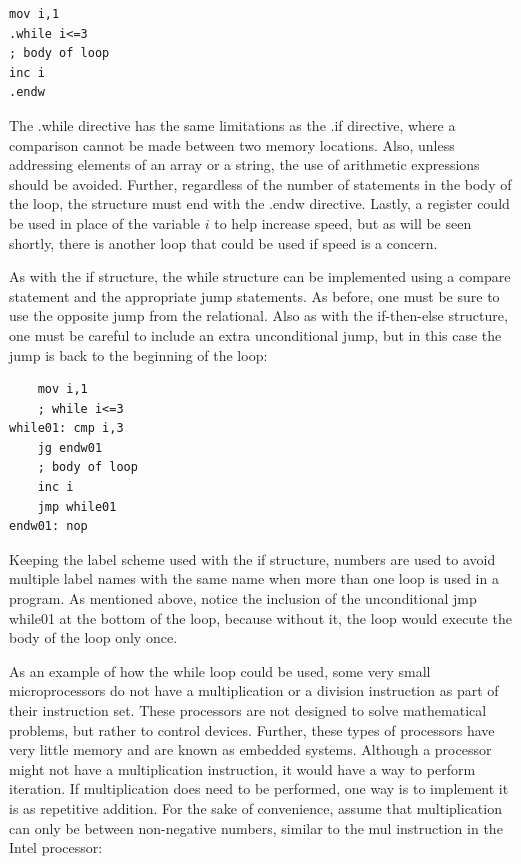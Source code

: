 \documentclass[10pt]{article}
\begin{document}
\begin{verbatim}
mov i,1
.while i<=3
; body of loop
inc i
.endw
\end{verbatim}

The .while directive has the same limitations as the .if directive, where a comparison cannot be made between two memory locations. Also, unless addressing elements of an array or a string, the use of arithmetic expressions should be avoided. Further, regardless of the number of statements in the body of the loop, the structure must end with the .endw directive. Lastly, a register could be used in place of the variable $i$ to help increase speed, but as will be seen shortly, there is another loop that could be used if speed is a concern.

As with the if structure, the while structure can be implemented using a compare statement and the appropriate jump statements. As before, one must be sure to use the opposite jump from the relational. Also as with the if-then-else structure, one must be careful to include an extra unconditional jump, but in this case the jump is back to the beginning of the loop:

\begin{verbatim}
    mov i,1
    ; while i<=3
while01: cmp i,3
    jg endw01
    ; body of loop
    inc i
    jmp while01
endw01: nop
\end{verbatim}

Keeping the label scheme used with the if structure, numbers are used to avoid multiple label names with the same name when more than one loop is used in a program. As mentioned above, notice the inclusion of the unconditional jmp while01 at the bottom of the loop, because without it, the loop would execute the body of the loop only once.

As an example of how the while loop could be used, some very small microprocessors do not have a multiplication or a division instruction as part of their instruction set. These processors are not designed to solve mathematical problems, but rather to control devices. Further, these types of processors have very little memory and are known as embedded systems. Although a processor might not have a multiplication instruction, it would have a way to perform iteration. If multiplication does need to be performed, one way is to implement it is as repetitive addition. For the sake of convenience, assume that multiplication can only be between non-negative numbers, similar to the mul instruction in the Intel processor:
\end{document}
